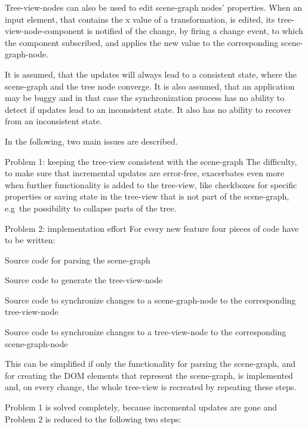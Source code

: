 Tree-view-nodes can also be used to edit scene-graph nodes' properties. When an
input element, that contains the x value of a transformation, is edited, its
tree-view-node-component is notified of the change, by firing a change event, to
which the component subscribed, and applies the new value to the corresponding
scene-graph-node.

It is assumed, that the updates will always lead to a consistent state, where the
scene-graph and the tree node converge. It is also assumed, that an application
may be buggy and in that case the synchronization process has no ability to
detect if updates lead to an inconsistent state. It also has no ability to
recover from an inconsistent state.

In the following, two main issues are described.

\begin{description*}
  \item[Problem 1: keeping the tree-view consistent with the scene-graph]
    The difficulty, to make sure that incremental updates are error-free,
    exacerbates even more when further functionality is
    added to the tree-view,  like checkboxes for
    specific properties or saving state in the tree-view that is not part of
    the scene-graph, e.g~the possibility to collapse parts of the tree.
  \item[Problem 2: implementation effort]
    For every new feature four pieces of code have to be written:
    \begin{enumerate*}
      \item Source code for parsing the scene-graph
      \item Source code to generate the tree-view-node
      \item Source code to synchronize changes to a scene-graph-node to the corresponding tree-view-node
      \item Source code to synchronize changes to a tree-view-node to the corresponding scene-graph-node
    \end{enumerate*}
\end{description*}

This can be simplified if only the functionality for parsing the
scene-graph, and  for creating the \gls{DOM} elements that represent the scene-graph,
is implemented and, on every change, the whole tree-view is recreated by repeating these steps.

Problem 1 is solved completely, because incremental updates are gone and
Problem 2 is reduced to the following two steps:

